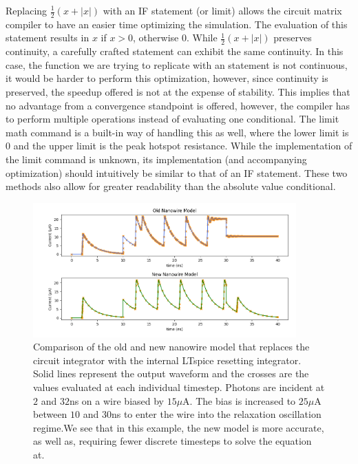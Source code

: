Replacing $\frac{1}{2}\left(x+|x|\right)$ with an IF statement (or limit) allows the circuit matrix compiler to
have an easier time optimizing the simulation. The evaluation of this statement results in $x$ if $x>0$, otherwise
$0$.
While $\frac{1}{2}\left(x+|x|\right)$ preserves continuity,
a carefully crafted  statement can exhibit the same continuity. 
In this case, the function we are trying to replicate with an  statement is not
continuous, it would be harder to perform this optimization, however, since continuity is
preserved, the speedup offered is not at the expense of stability.
This implies that no advantage from a
convergence standpoint is offered, however, the compiler has to perform multiple operations instead of
evaluating one conditional. The limit math command is a built-in way of handling this as well, where the
lower limit is $0$ and the upper limit is the peak hotspot resistance. While the implementation of the limit
command is unknown, its implementation (and accompanying optimization) should intuitively be similar to that
of an IF statement. These two methods also allow for greater readability than the absolute value conditional.

\begin{figure}
    \centering
    \includegraphics[width=0.9\textwidth]{figs/int_improvement_1e-3.png}
    \caption{Comparison of the old and new nanowire model that replaces the
    circuit integrator with the internal LTspice resetting integrator. Solid
    lines represent the output waveform and the crosses are the values evaluated at each
    individual timestep. Photons are incident at $2$ and $32$ns on a wire biased by $15\mu$A.
    The bias is increased to $25\mu$A between $10$ and $30$ns to enter the wire into the
    relaxation oscillation regime.We see that in this example, the new model is more accurate, as well as, requiring fewer discrete timesteps to solve the equation at.}
    \label{fig:int_improvement_1e-3}
\end{figure}

